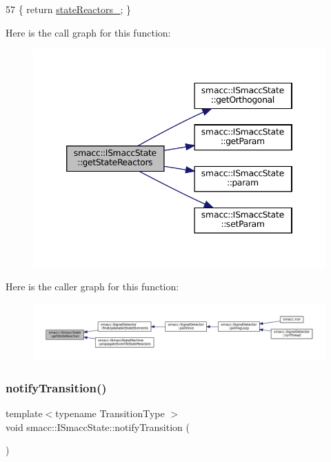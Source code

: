 \begin{DoxyCode}
57 \{ \textcolor{keywordflow}{return} \hyperlink{classsmacc_1_1ISmaccState_a7410a353b515f7b7357e94ef619a6c45}{stateReactors\_}; \}
\end{DoxyCode}
Here is the call graph for this function\+:
\nopagebreak
\begin{figure}[H]
\begin{center}
\leavevmode
\includegraphics[width=346pt]{classsmacc_1_1ISmaccState_acc40f4b3dd02a39242c7e23fe13c3e16_cgraph}
\end{center}
\end{figure}
Here is the caller graph for this function\+:
\nopagebreak
\begin{figure}[H]
\begin{center}
\leavevmode
\includegraphics[width=350pt]{classsmacc_1_1ISmaccState_acc40f4b3dd02a39242c7e23fe13c3e16_icgraph}
\end{center}
\end{figure}
\mbox{\label{classsmacc_1_1ISmaccState_a98df316afd79180d3c27a15a7d5dd1cf}} 
\subsubsection{\texorpdfstring{notify\+Transition()}{notifyTransition()}}
{\footnotesize\ttfamily template$<$typename Transition\+Type $>$ \\
void smacc\+::\+I\+Smacc\+State\+::notify\+Transition (\begin{DoxyParamCaption}{ }\end{DoxyParamCaption})}




